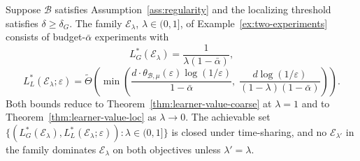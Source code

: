 \documentclass[runningheads,envcountsame]{llncs}
\newcommand{\cB}{\mathcal{B}}
\newcommand{\cE}{\mathcal{E}}
\newcommand{\eps}{\varepsilon}
\newcommand{\dis}{\theta}
\begin{document}
\begin{theorem}
\label{thm:pareto}
Suppose $\cB$ satisfies Assumption~\ref{ass:regularity} and the localizing threshold satisfies $\delta \geq \delta_G$. The family $\cE_\lambda$, $\lambda \in (0,1]$, of Example~\ref{ex:two-experiments} consists of budget-$\bar\alpha$ experiments with
\[
L^*_G(\cE_\lambda) = \frac{1}{\lambda(1-\bar\alpha)},
\]
\[
L^*_L(\cE_\lambda; \eps) = \tilde\Theta\!\left( \min\!\left( \frac{d \cdot \dis_{\cB,\mu}(\eps) \log(1/\eps)}{1-\bar\alpha},\; \frac{d \log(1/\eps)}{(1 - \lambda)(1-\bar\alpha)} \right) \right).
\]
Both bounds reduce to Theorem~\ref{thm:learner-value-coarse} at $\lambda = 1$ and to Theorem~\ref{thm:learner-value-loc} as $\lambda \to 0$. The achievable set $\{(L^*_G(\cE_\lambda), L^*_L(\cE_\lambda; \eps)) : \lambda \in (0,1]\}$ is closed under time-sharing, and no $\cE_{\lambda'}$ in the family dominates $\cE_\lambda$ on both objectives unless $\lambda' = \lambda$.
\end{theorem}
\end{document}
